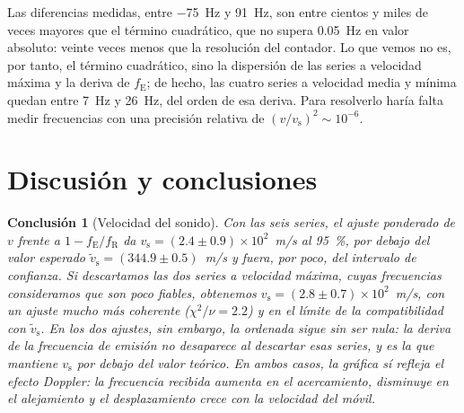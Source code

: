 \documentclass[a4paper,11pt]{amsart}
\numberwithin{equation}{section}
\newcommand{\vs}{v_{\mathrm{s}}}              %
\newcommand{\vst}{\tilde{v}_{\mathrm{s}}}     %
\newcommand{\fE}{f_{\mathrm{E}}}              %
\newcommand{\fR}{f_{\mathrm{R}}}              %
\theoremstyle{cienplano}
\newtheorem{conclusion}[proposicion]{Conclusión}
\theoremstyle{ciendef}
\theoremstyle{cienobs}
\begin{document}
Las diferencias medidas, entre \SI{-75}{\hertz} y \SI{+91}{\hertz}, son entre cientos
y miles de veces mayores que el término cuadrático, que no supera
\SI{0,05}{\hertz} en valor absoluto: veinte veces menos que la resolución del
contador. Lo que vemos no es, por tanto, el término cuadrático, sino la dispersión
de las series a velocidad máxima y la deriva de $\fE$; de hecho, las cuatro series
a velocidad media y mínima quedan entre \SI{+7}{\hertz} y \SI{+26}{\hertz}, del orden
de esa deriva. Para resolverlo haría falta medir frecuencias con una precisión
relativa de $(v/\vs)^{2}\sim10^{-6}$.

\newpage
\section{Discusión y conclusiones}\label{sec:discusion}
\begin{conclusion}[Velocidad del sonido]\label{conc:vs}
Con las seis series, el ajuste ponderado de $v$ frente a $1-\fE/\fR$ da
$\vs=(\num{2,4}\pm\num{0,9})\times10^{2}$~m/s al \SI{95}{\percent}, por debajo
del valor esperado $\vst=(\num{344,9}\pm\num{0,5})$~m/s y fuera, por poco, del
intervalo de confianza. Si descartamos las dos series a velocidad máxima, cuyas
frecuencias consideramos que son poco fiables, obtenemos $\vs=(\num{2,8}\pm\num{0,7})\times10^{2}$~m/s,
con un ajuste mucho más coherente ($\chi^{2}/\nu=\num{2,2}$) y en el límite de la
compatibilidad con $\vst$. En los dos ajustes, sin embargo, la ordenada sigue sin
ser nula: la deriva de la frecuencia de emisión no desaparece al descartar esas
series, y es la que mantiene $\vs$ por debajo del valor teórico. En ambos casos, la gráfica sí refleja el efecto Doppler: la frecuencia
recibida aumenta en el acercamiento, disminuye en el alejamiento y el
desplazamiento crece con la velocidad del móvil.
\end{conclusion}
\end{document}
